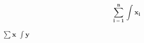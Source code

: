 \documentclass{article}
\begin{document}
\[
  \bm{\sum_{i=1}^n \int x_i}
\]

{\small $\bm{\sum x}$} {\large $\bm{\int y}$}
\end{document}
